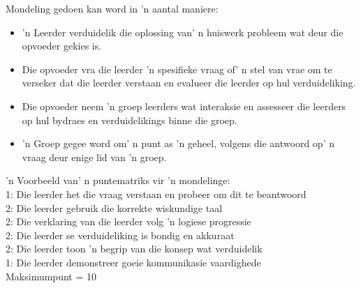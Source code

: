 Mondeling gedoen kan word in 'n aantal maniere:
\begin{itemize}[noitemsep]
\item
  'n Leerder verduidelik die oplossing van' n ​​huiswerk probleem wat deur die opvoeder gekies is.
\item
  Die opvoeder vra die leerder 'n spesifieke vraag of' n stel van vrae om te verseker dat die leerder verstaan ​​en evalueer die leerder op hul verduideliking.
\item
  Die opvoeder neem 'n groep leerders wat interaksie en assesseer die leerders op hul bydraes en verduidelikings binne die groep.
\item
  'n Groep gegee word om' n punt as 'n geheel, volgens die antwoord op' n vraag deur enige lid van 'n groep.
\end{itemize}
'n Voorbeeld van' n ​​puntematriks vir 'n mondelinge:\\
1: Die leerder het die vraag verstaan ​​en probeer om dit te beantwoord\\
2: Die leerder gebruik die korrekte wiskundige taal\\
2: Die verklaring van die leerder volg 'n logiese progressie\\
2: Die leerder se verduideliking is bondig en akkuraat\\
2: Die leerder toon 'n begrip van die konsep wat verduidelik\\
1: Die leerder demonstreer goeie kommunikasie vaardighede\\
Maksimumpunt = 10

